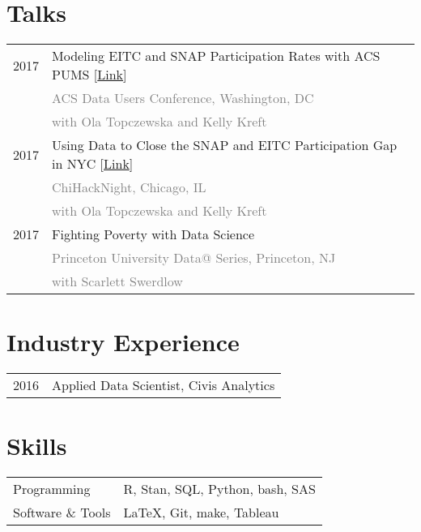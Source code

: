 \documentclass[12pt]{article}
\begin{document}
\section*{Talks}
\label{sec:talks}
\begin{tabular}{p{\datecolumn} l}
2017 & Modeling EITC and SNAP Participation Rates with ACS PUMS
[\href{http://www.ebmcdn.net/prb/iframe-video-viewer.php?viewnode=acs-may17/acs-051117-south-6}{Link}] \\
& \textcolor{gray}{ACS Data Users Conference, Washington, DC} \\
& \textcolor{gray}{with Ola Topczewska and Kelly Kreft} \\
2017 & Using Data to Close the SNAP and EITC Participation Gap in NYC
[\href{https://www.youtube.com/watch?v=XSQOCXwNqUA6}{Link}] \\
& \textcolor{gray}{ChiHackNight, Chicago, IL} \\
& \textcolor{gray}{with Ola Topczewska and Kelly Kreft} \\
2017 & Fighting Poverty with Data Science \\
& \textcolor{gray}{Princeton University Data@ Series, Princeton, NJ} \\
& \textcolor{gray}{with Scarlett Swerdlow} \\
\end{tabular}

\section*{Industry Experience}
\label{sec:industry_experience}
\begin{tabular}{p{\spancolumn} l}
2016\textendash 2018 & Applied Data Scientist, Civis Analytics
\end{tabular}

\section*{Skills}
\label{sec:skills}
\begin{tabular}{l l}
Programming & R, Stan, SQL, Python, bash, SAS \\
Software \& Tools & \LaTeX, Git, make, Tableau
\end{tabular}
\end{document}
